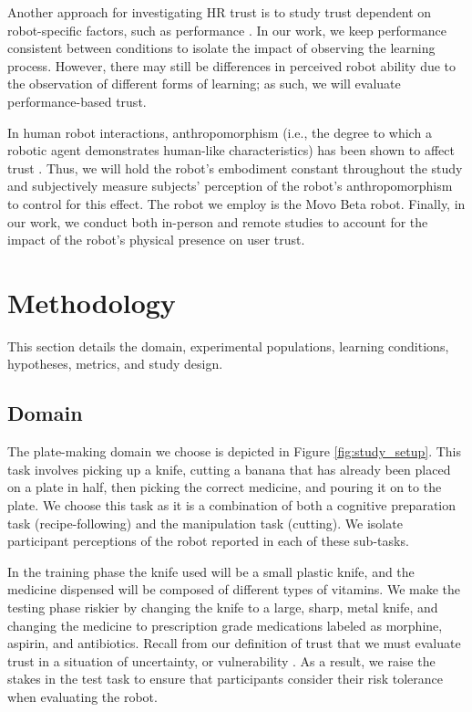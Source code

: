\documentclass[letterpaper]{article} %
\begin{document}
Another approach for investigating HR trust is to study trust dependent on robot-specific factors, such as performance \cite{hedlund_effects_2021}. In our work, we keep performance consistent between conditions to isolate the impact of observing the learning process. However, there may still be differences in perceived robot ability due to the observation of different forms of learning; as such, we will evaluate performance-based trust.

In human robot interactions, anthropomorphism (i.e., the degree to which a robotic agent demonstrates human-like characteristics) has been shown to affect trust \cite{3374839}. Thus, we will hold the robot's embodiment constant throughout the study and subjectively measure subjects' perception of the robot's anthropomorphism to control for this effect. The robot we employ is the Movo Beta robot. Finally, in our work, we conduct both in-person and remote studies to account for the impact of the robot's physical presence on user trust.




\section{Methodology}
\label{sec:methods}
This section details the domain, experimental populations, learning conditions, hypotheses, metrics, and study design. %

\subsection{Domain}
\label{sec:domain}
The plate-making domain we choose is depicted in Figure \ref{fig:study_setup}. This task involves picking up a knife, cutting a banana that has already been placed on a plate in half, then picking the correct medicine, and pouring it on to the plate. We choose this task as it is a combination of both a cognitive preparation task (recipe-following) and the manipulation task (cutting). We isolate participant perceptions of the robot reported in each of these sub-tasks.

In the training phase the knife used will be a small plastic knife, and the medicine dispensed will be composed of different types of vitamins. We make the testing phase riskier by changing the knife to a large, sharp, metal knife, and changing the medicine to prescription grade medications labeled as morphine, aspirin, and antibiotics. Recall from our definition of trust that we must evaluate trust in a situation of uncertainty, or vulnerability \cite{kohn_measurement_2021, ullman_what_2018}. As a result, we raise the stakes in the test task to ensure that participants consider their risk tolerance when evaluating the robot.
\end{document}

